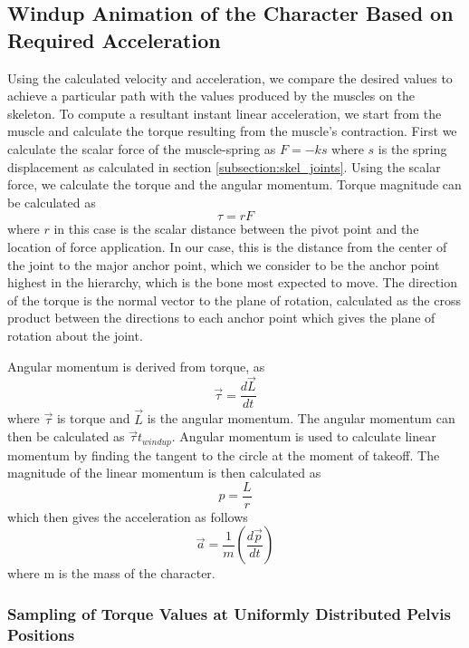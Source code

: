 \subsection{Windup Animation of the Character Based on Required Acceleration}
\label{subsection:torque_windup}

Using the calculated velocity and acceleration, we compare the desired values to achieve a particular path with the values produced by the muscles on the skeleton.  To compute a resultant instant linear acceleration, we start from the muscle and calculate the torque resulting from the muscle's contraction.  First we calculate the scalar force of the muscle-spring as $F = -k s$ where $s$ is the spring displacement as calculated in section \ref{subsection:skel_joints}.  Using the scalar force, we calculate the torque and the angular momentum.  Torque magnitude can be calculated as \[\tau = r F\] where $r$ in this case is the scalar distance between the pivot point and the location of force application.  In our case, this is the distance from the center of the joint to the major anchor point, which we consider to be the anchor point highest in the hierarchy, which is the bone most expected to move.  The direction of the torque is the normal vector to the plane of rotation, calculated as the cross product between the directions to each anchor point which gives the plane of rotation about the joint.

Angular momentum is derived from torque, as \[\vec{\tau} = \dfrac{d\vec{L}}{dt}\] where $\vec{\tau}$ is torque and $\vec{L}$ is the angular momentum.  The angular momentum can then be calculated as $\vec{\tau} t_{windup}$.  Angular momentum is used to calculate linear momentum by finding the tangent to the circle at the moment of takeoff.  The magnitude of the linear momentum is then calculated as \[p = \frac{L}{r}\] which then gives the acceleration as follows \[ \vec{a} = \frac{1}{m}\left(\dfrac{d\vec{p}}{dt}\right)\] where m is the mass of the character.

\subsubsection{Sampling of Torque Values at Uniformly Distributed Pelvis Positions}
\label{subsubsection:torque_sample}


